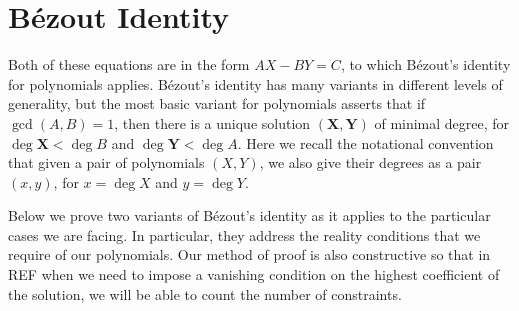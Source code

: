 \documentclass{article}
\begin{document}
\section{B\'ezout Identity}

Both of these equations are in the form $AX - BY = C$, to which B\'ezout's identity for polynomials applies. B\'ezout's identity has many variants in different levels of generality, but the most basic variant for polynomials asserts that if $\gcd(A,B) = 1$, then there is a unique solution $(\mathbf{X},\mathbf{Y})$ of minimal degree, for $\deg \mathbf{X} < \deg B$ and $\deg \mathbf{Y} < \deg A$. Here we recall the notational convention that given a pair of polynomials $(X,Y)$, we also give their degrees as a pair $(x,y)$, for $x=\deg X$ and $y=\deg Y$.

Below we prove two variants of B\'ezout's identity as it applies to the particular cases we are facing. In particular, they address the reality conditions that we require of our polynomials. Our method of proof is also constructive so that in REF when we need to impose a vanishing condition on the highest coefficient of the solution, we will be able to count the number of constraints.
\end{document}
